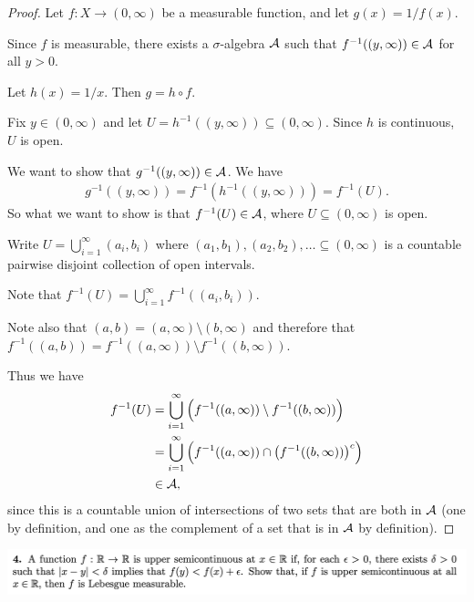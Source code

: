 \begin{proof}
  Let $f: X \to (0, \infty)$ be a measurable function, and let $g(x) = 1/f(x)$.

  Since $f$ is measurable, there exists a $\sigma$-algebra $\mathcal A$ such that $f^{-1}((y, \infty)) \in \mathcal A$
  for all $y > 0$.

  Let $h(x) = 1/x$. Then $g = h \circ f$.

  Fix $y \in (0, \infty)$ and let $U = h^{-1}((y, \infty)) \subseteq (0, \infty)$. Since $h$ is
  continuous, $U$ is open.

  We want to show that $g^{-1}((y, \infty)) \in \mathcal A$. We have
  \begin{align*}
    g^{-1}((y, \infty)) = f^{-1}(h^{-1}((y, \infty))) = f^{-1}(U).
  \end{align*}
  So what we want to show is that $f^{-1}(U) \in \mathcal A$, where $U \subseteq (0, \infty)$ is open.

  Write $U = \bigcup_{i=1}^\infty (a_i, b_i)$ where $(a_1, b_1), (a_2, b_2), \ldots \subseteq (0, \infty)$ is a
  countable pairwise disjoint collection of open intervals.

  Note that $f^{-1}(U) = \bigcup_{i=1}^\infty f^{-1}((a_i, b_i))$.

  Note also that $(a, b) = (a, \infty) \setminus (b, \infty)$ and therefore
  that $f^{-1}((a, b)) = f^{-1}((a, \infty)) \setminus f^{-1}((b, \infty))$.

  Thus we have
  \begin{align*}
    f^{-1}(U)
    &= \bigcup_{i=1}^\infty \Big(f^{-1}((a, \infty)) \setminus f^{-1}((b, \infty))\Big) \\
    &= \bigcup_{i=1}^\infty \Big(f^{-1}((a, \infty)) \cap \big(f^{-1}((b, \infty))\big)^c\Big) \\
    &\in \mathcal A,
  \end{align*}
  since this is a countable union of intersections of two sets that are both in $\mathcal A$ (one by definition, and
  one as the complement of a set that is in $\mathcal A$ by definition).
\end{proof}


\newpage
\begin{mdframed}
\includegraphics[width=400pt]{img/analysis--berkeley-202a-hw06-90b1.png}
\end{mdframed}


